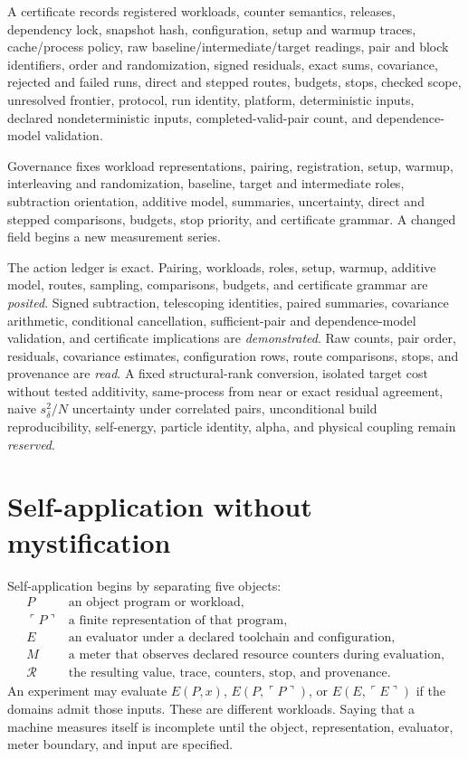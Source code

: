 A certificate records registered workloads, counter semantics, releases, dependency lock, snapshot hash,
configuration, setup and warmup traces, cache/process policy, raw baseline/intermediate/target readings, pair and
block identifiers, order and randomization, signed residuals, exact sums, covariance, rejected and failed runs,
direct and stepped routes, budgets, stops, checked scope, unresolved frontier, protocol, run identity, platform,
deterministic inputs, declared nondeterministic inputs, completed-valid-pair count, and dependence-model validation.

Governance fixes workload representations, pairing, registration, setup, warmup, interleaving and randomization,
baseline, target and intermediate roles, subtraction orientation, additive model, summaries, uncertainty, direct and
stepped comparisons, budgets, stop priority, and certificate grammar.  A changed field begins a new measurement
series.

The action ledger is exact.  Pairing, workloads, roles, setup, warmup, additive model, routes, sampling, comparisons,
budgets, and certificate grammar are \emph{posited}.  Signed subtraction, telescoping identities, paired summaries,
covariance arithmetic, conditional cancellation, sufficient-pair and dependence-model validation, and certificate
implications are \emph{demonstrated}.  Raw counts,
pair order, residuals, covariance estimates, configuration rows, route comparisons, stops, and provenance are
\emph{read}.  A fixed structural-rank conversion, isolated target cost without tested additivity, same-process from
near or exact residual agreement, naive \(s_\delta^2/N\) uncertainty under correlated pairs, unconditional build
reproducibility, self-energy, particle identity, alpha, and physical coupling remain \emph{reserved}.
\section{Self-application without mystification}

Self-application begins by separating five objects:
\[
\begin{array}{ll}
P&\text{an object program or workload},\\
\ulcorner P\urcorner&\text{a finite representation of that program},\\
E&\text{an evaluator under a declared toolchain and configuration},\\
M&\text{a meter that observes declared resource counters during evaluation},\\
\mathcal R&\text{the resulting value, trace, counters, stop, and provenance}.
\end{array}
\]
An experiment may evaluate \(E(P,x)\), \(E(P,\ulcorner P\urcorner)\), or
\(E(E,\ulcorner E\urcorner)\) if the domains admit those inputs.  These are different workloads.  Saying that a
machine measures itself is incomplete until the object, representation, evaluator, meter boundary, and input are
specified.

